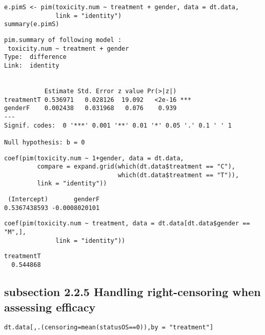 \documentclass[12pt]{article}
\begin{document}
\lstset{language=r,label= ,caption= ,captionpos=b,numbers=none}
\begin{lstlisting}
e.pimS <- pim(toxicity.num ~ treatment + gender, data = dt.data,
              link = "identity")
summary(e.pimS)
\end{lstlisting}

\begin{verbatim}
pim.summary of following model : 
 toxicity.num ~ treatment + gender
Type:  difference 
Link:  identity 


           Estimate Std. Error z value Pr(>|z|)    
treatmentT 0.536971   0.028126  19.092   <2e-16 ***
genderF    0.002438   0.031968   0.076    0.939    
---
Signif. codes:  0 '***' 0.001 '**' 0.01 '*' 0.05 '.' 0.1 ' ' 1

Null hypothesis: b = 0
\end{verbatim}

\lstset{language=r,label= ,caption= ,captionpos=b,numbers=none}
\begin{lstlisting}
coef(pim(toxicity.num ~ 1+gender, data = dt.data,
         compare = expand.grid(which(dt.data$treatment == "C"),
                               which(dt.data$treatment == "T")),
         link = "identity"))

\end{lstlisting}

\begin{verbatim}
 (Intercept)       genderF 
0.5367438593 -0.0008020101
\end{verbatim}


\lstset{language=r,label= ,caption= ,captionpos=b,numbers=none}
\begin{lstlisting}
coef(pim(toxicity.num ~ treatment, data = dt.data[dt.data$gender == "M",],
              link = "identity"))
\end{lstlisting}

\begin{verbatim}
treatmentT 
  0.544868
\end{verbatim}

\subsection{subsection 2.2.5 Handling right-censoring when assessing efficacy}
\label{sec:org6c35ca6}

\lstset{language=r,label= ,caption= ,captionpos=b,numbers=none}
\begin{lstlisting}
dt.data[,.(censoring=mean(statusOS==0)),by = "treatment"]
\end{lstlisting}
\end{document}
